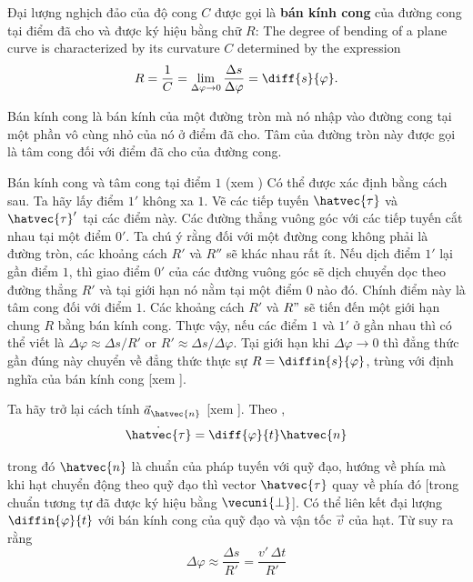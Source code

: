 Đại lượng nghịch đảo của độ cong $C$ được gọi là \textbf{bán kính cong} của đường cong tại điểm đã cho và được ký hiệu bằng chữ $R$:
The degree of bending of a plane curve is characterized by its curvature $C$ determined by the expression
\begin{equation}\label{eq:1_87}
R = \frac{1}{C} = \lim_{\Delta\varphi\to 0} \frac{\Delta s}{\Delta\varphi} = \diff{s}{\varphi}.
\end{equation}

\noindent
Bán kính cong là bán kính của một đường tròn mà nó nhập vào đường cong tại một phần vô cùng nhỏ của nó ở điểm đã cho. Tâm của đường tròn này được gọi là tâm cong đối với điểm đã cho của đường cong.

Bán kính cong và tâm cong tại điểm $1$ (xem ) Có thể được xác định bằng cách sau. Ta hãy lấy điểm $1'$ không xa $1$. Vẽ các tiếp tuyến $\hatvec{\tau}$ và $\hatvec{\tau}'$ tại các điểm này. Các đường thẳng vuông góc với các tiếp tuyến cắt nhau tại một điểm $0'$. Ta chú ý rằng đối với một đường cong không phải là đường tròn, các khoảng cách $R'$ và $R''$ sẽ khác nhau rất ít. Nếu dịch điểm $1'$ lại gần điểm $1$, thì giao điểm $0'$ của các đường vuông góc sẽ dịch chuyển dọc theo đường thẳng $R'$ và tại giới hạn nó nằm tại một điểm $0$ nào đó. Chính điểm này là tâm cong đối với điểm $1$. Các khoảng cách $R'$ và $R"$ sẽ tiến đến một giới hạn chung $R$ bằng bán kính cong. Thực vậy, nếu các điểm $1$ và $1'$ ở gần nhau thì có thể viết là $\Delta\varphi\approx\Delta s/R'$ or $R' \approx \Delta s/\Delta\varphi$. Tại giới hạn khi $\Delta\varphi\to 0$ thì đẳng thức gần đúng này chuyển về đẳng thức thực sự $R=\diffin{s}{\varphi}$, trùng với định nghĩa của bán kính cong [xem ].

Ta hãy trở lại cách tính $\vec{a}_{\hatvec{n}}$ [xem ]. Theo ,
\begin{equation}\label{eq:1_88}
\dot{\hatvec{\tau}} = \diff{\varphi}{t}\hatvec{n}
\end{equation}

\noindent
trong đó $\hatvec{n}$ là chuẩn của pháp tuyến với quỹ đạo, hướng về phía mà khi hạt chuyển động theo quỹ đạo thì vector $\hatvec{\tau}$ quay về phía đó [trong  chuẩn tương tự đã được ký hiệu bằng $\vecuni{\perp}$]. Có thể liên kết đại lượng $\diffin{\varphi}{t}$ với bán kính cong của quỹ đạo và vận tốc $\vec{v}$ của hạt. Từ  suy ra rằng
\begin{equation*}
\Delta\varphi\approx \frac{\Delta s}{R'} = \frac{v'\,\Delta t}{R'}
\end{equation*}

